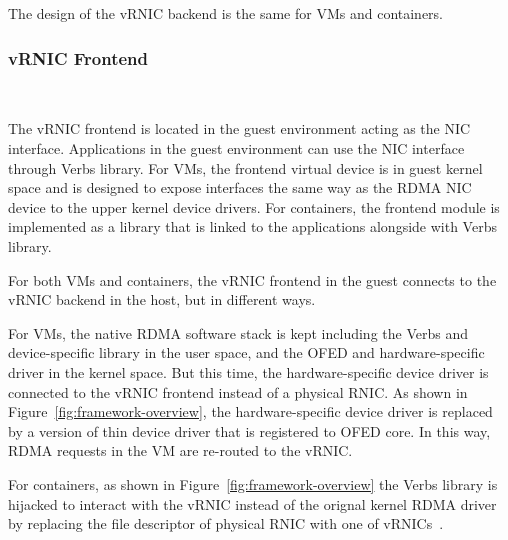 The design of the vRNIC backend is the same for VMs and containers.

\subsubsection{\textbf{vRNIC Frontend}}

\
\noindent

The vRNIC frontend is located in the guest environment acting as the NIC interface. Applications in the guest environment can use the NIC interface through Verbs library. For VMs, the frontend virtual device is in guest kernel space and is designed to expose interfaces the same way as the RDMA NIC device to the upper kernel device drivers. For containers, the frontend module is implemented as a library that is linked to the applications alongside with Verbs library.


For both VMs and containers, the vRNIC frontend in the guest connects to the vRNIC backend in the host, but in different ways.

For VMs, the native RDMA software stack is kept including the Verbs and device-specific library in the user space, and the OFED and hardware-specific driver in the kernel space. But this time, the hardware-specific device driver is connected to the vRNIC frontend instead of a physical RNIC. As shown in Figure~\ref{fig:framework-overview}, the hardware-specific device driver is replaced by a \sys version of thin device driver that is registered to OFED core. In this way, RDMA requests in the VM are re-routed to the vRNIC.

For containers, as shown in Figure~\ref{fig:framework-overview} the Verbs library is hijacked to interact with the vRNIC instead of the orignal kernel RDMA driver by replacing the file descriptor of physical RNIC with one of vRNICs~\cite{kim2019freeflow}.

